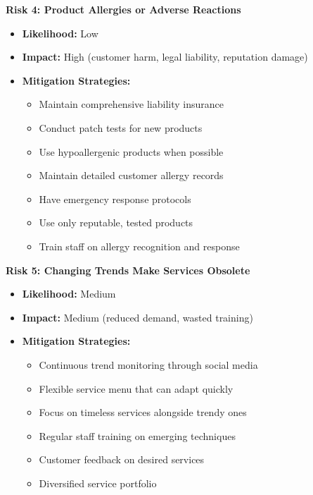 \documentclass[a4paper,12pt]{article}
\begin{document}
\textbf{Risk 4: Product Allergies or Adverse Reactions}
\begin{itemize}[leftmargin=2em]
    \item \textbf{Likelihood:} Low
    \item \textbf{Impact:} High (customer harm, legal liability, reputation damage)
    \item \textbf{Mitigation Strategies:}
    \begin{itemize}
        \item Maintain comprehensive liability insurance
        \item Conduct patch tests for new products
        \item Use hypoallergenic products when possible
        \item Maintain detailed customer allergy records
        \item Have emergency response protocols
        \item Use only reputable, tested products
        \item Train staff on allergy recognition and response
    \end{itemize}
\end{itemize}

\textbf{Risk 5: Changing Trends Make Services Obsolete}
\begin{itemize}[leftmargin=2em]
    \item \textbf{Likelihood:} Medium
    \item \textbf{Impact:} Medium (reduced demand, wasted training)
    \item \textbf{Mitigation Strategies:}
    \begin{itemize}
        \item Continuous trend monitoring through social media
        \item Flexible service menu that can adapt quickly
        \item Focus on timeless services alongside trendy ones
        \item Regular staff training on emerging techniques
        \item Customer feedback on desired services
        \item Diversified service portfolio
    \end{itemize}
\end{itemize}
\end{document}
